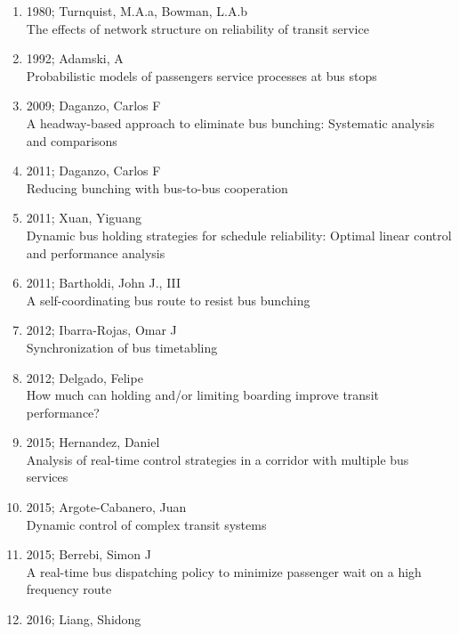 \documentclass{article}
\begin{document}
\begin{enumerate}
    \item 1980; Turnquist, M.A.a, Bowman, L.A.b\\
    The effects of network structure on reliability of transit service
    \item 1992; Adamski, A\\
    Probabilistic models of passengers service processes at bus stops
    \item 2009; Daganzo, Carlos F\\
    A headway-based approach to eliminate bus bunching: Systematic analysis and comparisons
    \item 2011; Daganzo, Carlos F\\
    Reducing bunching with bus-to-bus cooperation
    \item 2011; Xuan, Yiguang\\
    Dynamic bus holding strategies for schedule reliability: Optimal linear control and performance analysis
    \item 2011; Bartholdi, John J., III\\
    A self-coordinating bus route to resist bus bunching                                                                     
    \item 2012; Ibarra-Rojas, Omar J\\
    Synchronization of bus timetabling                                                                                       
    \item 2012; Delgado, Felipe\\
    How much can holding and/or limiting boarding improve transit performance?                                               
    \item 2015; Hernandez, Daniel\\
    Analysis of real-time control strategies in a corridor with multiple bus services                                        
    \item 2015; Argote-Cabanero, Juan\\
    Dynamic control of complex transit systems                                                                               
    \item 2015; Berrebi, Simon J\\
    A real-time bus dispatching policy to minimize passenger wait on a high frequency route                                  
    \item 2016; Liang, Shidong\\

\end{enumerate}
\end{document}

